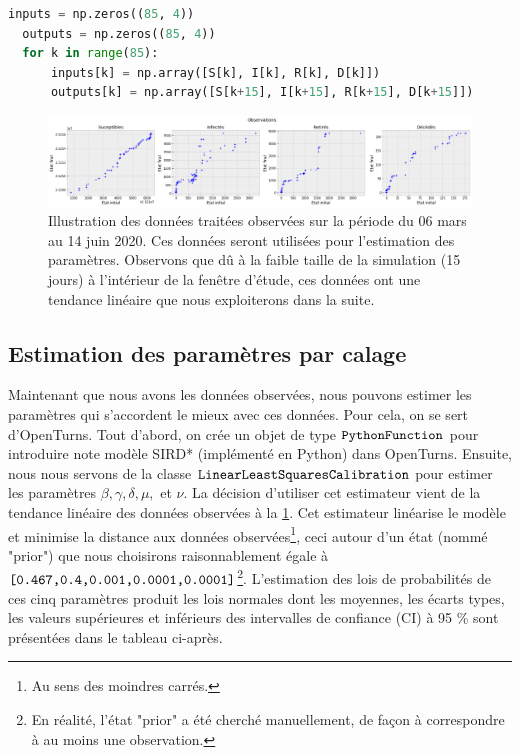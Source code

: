 \documentclass[
  french,
	10pt, %
]{fphw}
\begin{document}
\begin{lstlisting}[language=Python, caption={Code de génération des entrées-sorties afin d'effectuer l'estimation des paramètres. Les données S, I, R, et D correspondent à ce qui est observé à la \cref{fig:pretreated}.},breaklines]
  inputs = np.zeros((85, 4))
  outputs = np.zeros((85, 4))
  for k in range(85):
      inputs[k] = np.array([S[k], I[k], R[k], D[k]])
      outputs[k] = np.array([S[k+15], I[k+15], R[k+15], D[k+15]])
\end{lstlisting}  

\begin{figure}[H]
  \centering
  \includegraphics[width=\linewidth]{treated.png}
  \caption{Illustration des données traitées observées sur la période du 06 mars au 14 juin 2020. Ces données seront utilisées pour l'estimation des paramètres. Observons que dû à la faible taille de la simulation (15 jours) à l'intérieur de la fenêtre d'étude, ces données ont une tendance linéaire que nous exploiterons dans la suite. }
  \label{fig:treated}
\end{figure}

\subsection{Estimation des paramètres par calage}

Maintenant que nous avons les données observées, nous pouvons estimer les paramètres qui s'accordent le mieux avec ces données. Pour cela, on se sert d'OpenTurns. Tout d'abord, on crée un objet de type $\verb|PythonFunction|$ pour introduire note modèle SIRD* (implémenté en Python) dans OpenTurns. Ensuite, nous nous servons de la classe $\verb|LinearLeastSquaresCalibration|$ pour estimer les paramètres $\beta, \gamma, \delta, \mu,$ et $\nu$. La décision d'utiliser cet estimateur vient de la tendance linéaire des données observées à la \cref{fig:treated}. Cet estimateur linéarise le modèle et minimise la distance aux données observées\footnote{Au sens des moindres carrés.}, ceci autour d'un état (nommé "prior") que nous choisirons raisonnablement égale à $\verb|[0.467,0.4,0.001,0.0001,0.0001]|$\footnote{En réalité, l'état "prior" a été cherché manuellement, de façon à correspondre à au moins une observation.}. L'estimation des lois de probabilités de ces cinq paramètres produit les lois normales dont les moyennes, les écarts types, les valeurs supérieures et inférieurs des intervalles de confiance (CI) à 95 \% sont présentées dans le tableau ci-après.
\end{document}
